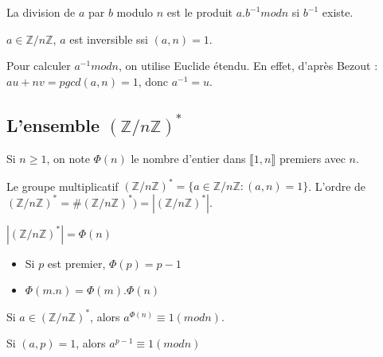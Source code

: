 \documentclass[a4paper, 10pt]{thesis}
\begin{document}
\begin{df}
    La division de $a$ par $b$ modulo $n$ est le produit $a.b^{-1} mod n$ si $b^{-1}$ existe.
\end{df}

\begin{prop}
    $a \in \mathbb{Z}/n\mathbb{Z}$, $a$ est inversible ssi $(a,n) = 1$.
\end{prop}


Pour calculer $a^{-1} mod n$, on utilise Euclide étendu. En effet, d'après Bezout : $au + nv =
pgcd(a, n) = 1$, donc $a^{-1} = u$.

\subsection{L'ensemble $(\mathbb{Z}/n\mathbb{Z})^*$}

\begin{df}
    Si $n \geq 1$, on note $\Phi(n)$ le nombre d'entier dans $\llbracket 1, n \rrbracket$ premiers
    avec $n$.
\end{df}

\begin{df}
    Le groupe multiplicatif $(\mathbb{Z}/n\mathbb{Z})^* = \{a \in \mathbb{Z}/n\mathbb{Z} : (a,n) =
    1\}$. L'ordre de $(\mathbb{Z}/n\mathbb{Z})^* = \#(\mathbb{Z} / n\mathbb{Z})^*) = |(\mathbb{Z} / n
    \mathbb{Z})^*|$.
\end{df}

\begin{rq}
    $|(\mathbb{Z}/n\mathbb{Z})^*| = \Phi(n)$
\end{rq}

\begin{prop}
    \begin{itemize}
        \item Si $p$ est premier, $\Phi(p) = p-1$
        \item $\Phi(m.n) = \Phi(m) . \Phi(n)$
    \end{itemize}
\end{prop}

\begin{thrm}
    Si $a \in (\mathbb{Z}/n\mathbb{Z})^*$, alors $a^{\Phi(n)} \equiv 1 (mod n)$.
\end{thrm}

\begin{corol}
    Si $(a, p) = 1$, alors $a^{p-1} \equiv 1 (mod n)$
\end{corol}
\end{document}
